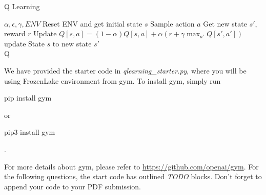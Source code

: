 \documentclass{article}
\begin{document}
\begin{algorithm}
\caption{Q Learning}\label{alg:cap}
\begin{algorithmic}
\Require $\alpha, \epsilon, \gamma, ENV$
\State Reset ENV and get initial state $s$
    \State Sample action $a$
    \State Get new state $s'$, reward $r$
    \State Update $Q[s, a] = (1-\alpha)Q[s, a] + \alpha(r + \gamma \max_{a'} Q[s', a'])$
    \State update State $s$ to new state $s'$
\EndWhile
\EndWhile\\
\Return Q
\end{algorithmic}
\end{algorithm}

\noindent
We have provided the starter code in \emph{qlearning\_starter.py}, where you will be using FrozenLake environment from gym. To install gym, simply run \begin{foo}pip install gym \end{foo} 
or \begin{foo}pip3 install gym\end{foo}. 

For more details about gym, please refer to \hyperlink{https://github.com/openai/gym}{https://github.com/openai/gym}. For the following questions, the start code has outlined \emph{TODO} blocks. Don't forget to append your code to your PDF submission.
\end{document}
